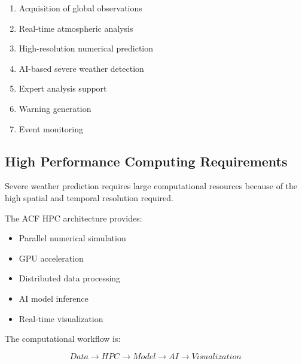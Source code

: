 \begin{enumerate}

\item Acquisition of global observations

\item Real-time atmospheric analysis

\item High-resolution numerical prediction

\item AI-based severe weather detection

\item Expert analysis support

\item Warning generation

\item Event monitoring

\end{enumerate}



\subsection{High Performance Computing Requirements}

Severe weather prediction requires large computational resources because
of the high spatial and temporal resolution required.

The ACF HPC architecture provides:

\begin{itemize}

\item Parallel numerical simulation

\item GPU acceleration

\item Distributed data processing

\item AI model inference

\item Real-time visualization

\end{itemize}


The computational workflow is:

\[
Data
\rightarrow
HPC
\rightarrow
Model
\rightarrow
AI
\rightarrow
Visualization
\]



